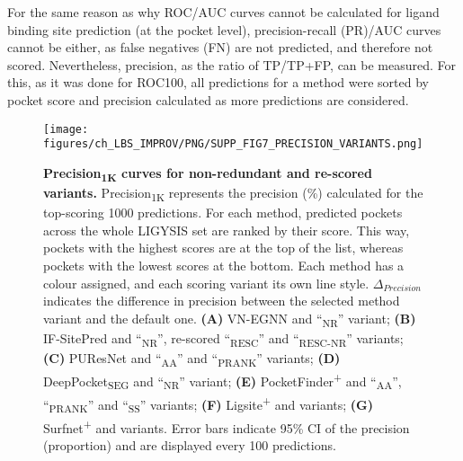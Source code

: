 For the same reason as why ROC/AUC curves cannot be calculated for ligand binding site prediction (at the pocket level), precision-recall (PR)/AUC curves cannot be either, as false negatives (FN) are not predicted, and therefore not scored. Nevertheless, precision, as the ratio of TP/TP+FP, can be measured. For this, as it was done for ROC100, all predictions for a method were sorted by pocket score and precision calculated as more predictions are considered.

\begin{figure}[ht!]
    \centering
    \texttt{[image: figures/ch\_LBS\_IMPROV/PNG/SUPP\_FIG7\_PRECISION\_VARIANTS.png]}
    \caption[Precision\textsubscript{1K} curves for non-redundant and re-scored variants]{\textbf{Precision\textsubscript{1K} curves for non-redundant and re-scored variants.}  Precision\textsubscript{1K} represents the precision (\%) calculated for the top-scoring 1000 predictions. For each method, predicted pockets across the whole LIGYSIS set are ranked by their score. This way, pockets with the highest scores are at the top of the list, whereas pockets with the lowest scores at the bottom. Each method has a colour assigned, and each scoring variant its own line style. $\Delta_{Precision}$ indicates the difference in precision between the selected method variant and the default one.  \textbf{(A)} VN-EGNN and ``\textsubscript{NR}'' variant; \textbf{(B)} IF-SitePred and ``\textsubscript{NR}'', re-scored ``\textsubscript{RESC}'' and ``\textsubscript{RESC-NR}'' variants; \textbf{(C)} PUResNet and ``\textsubscript{AA}'' and ``\textsubscript{PRANK}'' variants; \textbf{(D)} DeepPocket\textsubscript{SEG} and ``\textsubscript{NR}'' variant; \textbf{(E)} PocketFinder\textsuperscript{+} and ``\textsubscript{AA}'', ``\textsubscript{PRANK}'' and ``\textsubscript{SS}'' variants; \textbf{(F)} Ligsite\textsuperscript{+} and variants; \textbf{(G)} Surfnet\textsuperscript{+} and variants. Error bars indicate 95\% CI of the precision (proportion) and are displayed every 100 predictions.}
    \label{fig:pocket_precision_variants}
\end{figure}


